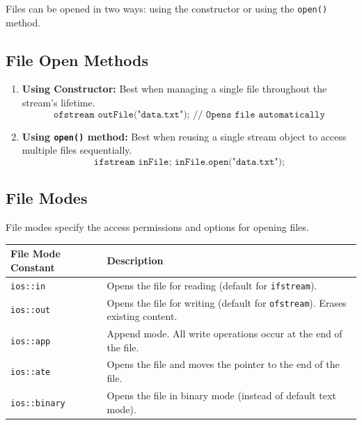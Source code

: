 \documentclass[12pt,a4paper]{article}
\renewcommand{\arraystretch}{1.45}
\begin{document}
Files can be opened in two ways: using the constructor or using the \texttt{open()} method.

\subsection{File Open Methods}
\begin{enumerate}[label=\textbf{\arabic*.}, leftmargin=*, itemsep=3pt]
  \item \textbf{Using Constructor:} Best when managing a single file throughout the stream's lifetime.
    \begin{equation}
      \texttt{ofstream outFile("data.txt"); // Opens file automatically}
    \end{equation}
  \item \textbf{Using \texttt{open()} method:} Best when reusing a single stream object to access multiple files sequentially.
    \begin{equation}
      \texttt{ifstream inFile; inFile.open("data.txt");}
    \end{equation}
\end{enumerate}

\subsection{File Modes}
File modes specify the access permissions and options for opening files.
\renewcommand{\arraystretch}{1.3}
\par\noindent
\begin{tabularx}{\linewidth}{|B{3.4cm}|Y|}
\hline
\textbf{File Mode Constant} & \textbf{Description} \\
\hline
\texttt{ios::in} & Opens the file for reading (default for \texttt{ifstream}). \\
\hline
\texttt{ios::out} & Opens the file for writing (default for \texttt{ofstream}). Erases existing content. \\
\hline
\texttt{ios::app} & Append mode. All write operations occur at the end of the file. \\
\hline
\texttt{ios::ate} & Opens the file and moves the pointer to the end of the file. \\
\hline
\texttt{ios::binary} & Opens the file in binary mode (instead of default text mode). \\
\hline
\end{tabularx}

\end{document}
